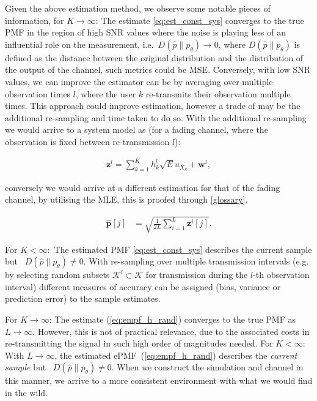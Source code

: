 \documentclass{article}
\begin{document}
Given the above estimation method, we observe some notable pieces of information, for $K \rightarrow \infty$: The estimate \cref{eq:est_const_sys} converges to the true PMF in the region of high SNR values where the noise is playing less of an influential role on the measurement, i.e.~$D(\hat{p}\| p_{\theta}) \rightarrow 0$, where $D(\hat{p}\| p_{\theta})$ is defined as the distance between the original distribution and the distribution of the output of the channel, such metrics could be \ac{MSE}. 
Conversely, with low SNR values, we can improve the estimator can be by averaging over multiple observation times $l$, where the user $k$ re-transmits their observation multiple times. This approach could improve estimation, however a trade of may be the additional re-sampling and time taken to do so. With the additional re-sampling we would arrive to a system model as (for a fading channel, where the observation is fixed between re-transmission $l$):

\begin{align}
    \boldsymbol{z}^l = \sum_{k=1}^K h_k^l  \sqrt{E}u_{X_k} + \boldsymbol{w}^l, \label{eq:system_model_retrans}
\end{align}


conversely we would arrive at a different estimation for that of the fading channel, by utilising the \ac{MLE}, this is proofed through \cref{glossary}. 


\begin{align}
    \boldsymbol{\hat{p}}[j] &= \sqrt{\frac{1}{2L} \sum_{i = 1}^{L}\boldsymbol{z}^i[j]}.\label{eq:empf_h_rand}
\end{align}

For $K <\infty:$ The estimated PMF \cref{eq:est_const_sys} describes the current sample but ~$D(\hat{p}\| p_{\theta}) \neq 0$. With re-sampling over multiple transmission intervals (e.g. by selecting random subsets $\mathcal{K}^l \subset \mathcal{K}$ for transmission during the $l$-th observation interval) different measures of accuracy can be assigned (bias, variance or prediction error) to the sample estimates.

For $K \rightarrow \infty$: The estimate (\ref{eq:empf_h_rand}) converges to the true PMF as $L \rightarrow \infty$. However, this is not of practical relevance, due to the associated costs in re-transmitting the signal in such high order of magnitudes needed. For $K <\infty:$ With $L \rightarrow \infty$, the estimated ePMF~(\ref{eq:empf_h_rand}) describes the \emph{current sample} but ~$D(\hat{p}\| p_{\theta}) \neq 0$. When we construct the simulation and channel in this manner, we arrive to a more consistent environment with what we would find in the wild.
\end{document}
